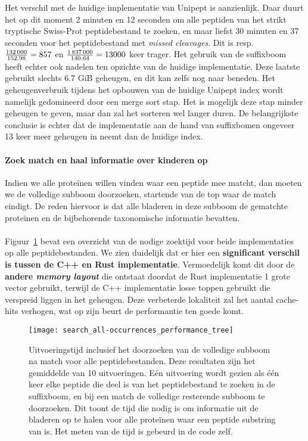 Het verschil met de huidige implementatie van Unipept is aanzienlijk.
Daar duurt het op dit moment 2 minuten en 12 seconden om alle peptiden van het strikt tryptische Swiss-Prot peptidebestand te zoeken,
en maar liefst 30 minuten en 37 seconden voor het peptidebestand met \textit{missed cleavages}.
Dit is resp.~$\frac{132\thinspace000}{152.98} = 857$ en $\frac{1\thinspace837\thinspace000}{140.64} = 13 000$ keer trager.
Het gebruik van de suffixboom heeft echter ook nadelen ten opzichte van de huidige implementatie.
Deze laatste gebruikt slechts 6.7 GiB geheugen, en dit kan zelfs nog naar beneden.
Het geheugenverbruik tijdens het opbouwen van de huidige Unipept index wordt namelijk gedomineerd door een merge sort stap.
Het is mogelijk deze stap minder geheugen te geven, maar dan zal het sorteren wel langer duren.
De belangrijkste conclusie is echter dat de implementatie aan de hand van suffixbomen ongeveer 13 keer meer geheugen in neemt dan de huidige index.

\paragraph{Zoek match en haal informatie over kinderen op}
Indien we alle proteïnen willen vinden waar een peptide mee matcht, dan moeten we de volledige subboom doorzoeken, startende van de top waar de match eindigt.
De reden hiervoor is dat alle bladeren in deze subboom de gematchte proteïnen en de bijbehorende taxonomische informatie bevatten.
\\ \\
Figuur~\ref{fig:performance_all-occurrences_tree} bevat een overzicht van de nodige zoektijd voor beide implementaties op alle peptidebestanden.
We zien duidelijk dat er hier een \textbf{significant verschil is tussen de C++ en Rust implementatie}.
Vermoedelijk komt dit door de \textbf{andere \textit{memory layout}} die ontstaat doordat de Rust implementatie 1 grote vector gebruikt, terwijl de C++ implementatie losse toppen gebruikt die verspreid liggen in het geheugen.
Deze verbeterde lokaliteit zal het aantal cache-hits verhogen, wat op zijn beurt de performantie ten goede komt.

\begin{figure}[ht]
    \centering
    \texttt{[image: search\_all-occurrences\_performance\_tree]}
    \caption{Uitvoeringstijd inclusief het doorzoeken van de volledige subboom na match voor alle peptidebestanden. Deze resultaten zijn het gemiddelde van 10 uitvoeringen. Eén uitvoering wordt gezien als één keer elke peptide die deel is van het peptidebestand te zoeken in de suffixboom, en bij een match de volledige resterende subboom te doorzoeken. Dit toont de tijd die nodig is om informatie uit de bladeren op te halen voor alle proteïnen waar een peptide substring van is. Het meten van de tijd is gebeurd in de code zelf.}
    \label{fig:performance_all-occurrences_tree}
\end{figure}


